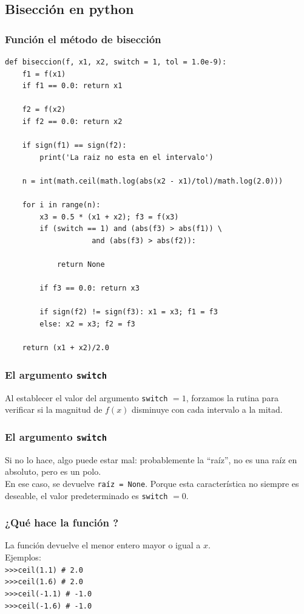 \documentclass[12pt]{beamer}
\begin{document}
\subsection{Bisección en python}

\begin{frame}
\frametitle{Función el método de bisección}
\begin{lstlisting}[caption=Método de bisección con \python]
def biseccion(f, x1, x2, switch = 1, tol = 1.0e-9):
    f1 = f(x1)
    if f1 == 0.0: return x1
    
    f2 = f(x2)
    if f2 == 0.0: return x2
    
    if sign(f1) == sign(f2):
        print('La raiz no esta en el intervalo')

    n = int(math.ceil(math.log(abs(x2 - x1)/tol)/math.log(2.0)))
    
    for i in range(n):
        x3 = 0.5 * (x1 + x2); f3 = f(x3)
        if (switch == 1) and (abs(f3) > abs(f1)) \
                    and (abs(f3) > abs(f2)):
                        
            return None
        
        if f3 == 0.0: return x3

        if sign(f2) != sign(f3): x1 = x3; f1 = f3
        else: x2 = x3; f2 = f3
    
    return (x1 + x2)/2.0
\end{lstlisting}
\end{frame}
\begin{frame}
\frametitle{El argumento \texttt{switch}}
Al establecer el valor del argumento \texttt{switch} $=1$, forzamos la rutina para verificar si la magnitud de $f (x)$ disminuye con cada intervalo
a la mitad.
\end{frame}
\begin{frame}
\frametitle{El argumento \texttt{switch}}
Si no lo hace, algo puede estar mal: \pause probablemente la \enquote{raíz}, no es una raíz en absoluto, pero es un polo.
\\
\bigskip
\pause
En ese caso, se devuelve \texttt{raíz = None}. Porque esta característica no siempre es deseable, el valor predeterminado es \texttt{switch} $= 0$.
\end{frame}
\begin{frame}[fragile]
\frametitle{¿Qué hace la función ?}
La función  devuelve el menor entero mayor o igual a $x$.
\\
\medskip
\pause
Ejemplos:\\
\medskip
\verb|>>>ceil(1.1) # 2.0| \\ \pause
\verb|>>>ceil(1.6) # 2.0| \\ \pause
\verb|>>>ceil(-1.1) # -1.0| \\ \pause
\verb|>>>ceil(-1.6) # -1.0|
\end{frame}
\end{document}
